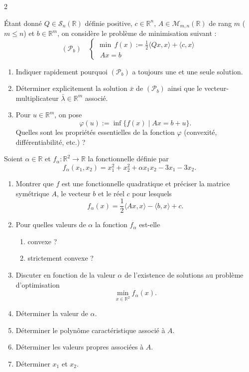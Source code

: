 \begin{multicols}{2}
\begin{exo}
	Étant donné $Q \in \mathcal{S}_{n}(\mathbb{R})$ définie positive, $c \in \mathbb{R}^{n}$, $A \in \mathcal{M}_{m, n}(\mathbb{R})$ de rang $m$ ($m \leqslant n$) et $b \in \mathbb{R}^{m}$, on considère le problème de minimisation suivant :
	\[
	(\mathcal{P}_{b}) \quad
	\begin{cases}
	\min \, f(x) := \frac{1}{2} \langle Qx, x \rangle + \langle c, x \rangle \\
	\,\, Ax = b
	\end{cases}
	\]
	\begin{enumerate}[label=\arabic*.]
		\item Indiquer rapidement pourquoi $(\mathcal{P}_{b})$ a toujours une et une seule solution.
		\item Déterminer explicitement la solution $\bar{x}$ de $(\mathcal{P}_{b})$ ainsi que le vecteur-multiplicateur $\bar{\lambda} \in \mathbb{R}^{m}$ associé.
		\item Pour $u \in \mathbb{R}^{m}$, on pose
		\[
		\varphi(u) := \inf \{ f(x) \mid Ax = b + u \}.
		\]
		Quelles sont les propriétés essentielles de la fonction $\varphi$ (convexité, différentiabilité, etc.) ?
	\end{enumerate}
\end{exo}

\begin{exo}
	Soient $\alpha \in \mathbb{R}$ et $f_{\alpha} : \mathbb{R}^{2} \rightarrow \mathbb{R}$ la fonctionnelle définie par
	\[
	f_{\alpha}(x_{1}, x_{2}) = x_{1}^{2} + x_{2}^{2} + \alpha x_{1} x_{2} - 3x_{1} - 3x_{2}.
	\]
	\begin{enumerate}[label=\arabic*.]
		\item Montrer que $f$ est une fonctionnelle quadratique et préciser la matrice symétrique $A$, le vecteur $b$ et le réel $c$ pour lesquels
		\[
		f_{\alpha}(x) = \frac{1}{2} \langle Ax, x \rangle - \langle b, x \rangle + c.
		\]
		\item Pour quelles valeurs de $\alpha$ la fonction $f_{\alpha}$ est-elle
		\begin{enumerate}
			\item convexe ?
			\item strictement convexe ?
		\end{enumerate}
		\item Discuter en fonction de la valeur $\alpha$ de l'existence de solutions au problème d'optimisation
		\[
		\min_{x \in \mathbb{R}^{2}} f_{\alpha}(x).
		\]
		\item Déterminer la valeur de $\alpha$.
		\item Déterminer le polynôme caractéristique associé à $A$.
		\item Déterminer les valeurs propres associées à $A$.
		\item Déterminer $x_{1}$ et $x_{2}$.
	\end{enumerate}
\end{exo}


\end{multicols}
